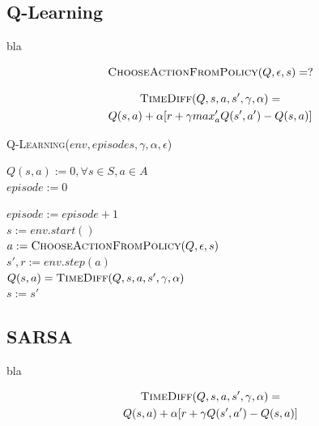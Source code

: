 \documentclass[letterpaper]{article}
\begin{document}
\subsection{Q-Learning}

bla

\begin{equation} \label{eq:epsilon_greedy_action}
  \textsc{ChooseActionFromPolicy}(Q, \epsilon, s) = ?
\end{equation}

\begin{multline} \label{eq:time_diff_update_q_learning}
  \textsc{TimeDiff}(Q, s, a, s', \gamma, \alpha) = \\ 
      Q(s,a) + \alpha [r + \gamma max_a' Q(s', a') - Q(s,a)]
\end{multline}

\linesnumbered
\dontprintsemicolon
\begin{algorithm}[t!]
{
	\caption{\textsc{Q-Learning}($ env, episodes, \gamma, \alpha, \epsilon $)}
	\label{alg:q-learning}
    $Q(s,a) := 0, \forall s \in S, a \in A $\\
    $episode := 0$

    {
      $episode := episode + 1$\\
      $s := env.start()$\\

      {
        $a := \textsc{ChooseActionFromPolicy}(Q, \epsilon, s) $\\
        $s', r := env.step(a)$\\
        $Q(s, a) = \textsc{TimeDiff}(Q, s, a, s', \gamma, \alpha)$\\
        $s := s'$ \\
      }
    }

}
\end{algorithm}

\subsection{SARSA}

bla

\begin{multline} \label{eq:time_diff_update_sarsa}
  \textsc{TimeDiff}(Q, s, a, s', \gamma, \alpha) = \\ 
      Q(s,a) + \alpha [r + \gamma Q(s', a') - Q(s,a)]
\end{multline}
\end{document}

